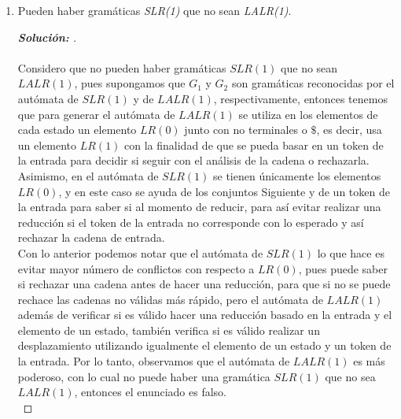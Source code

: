 \documentclass{article}
\begin{document}
\begin{enumerate}
\begin{enumerate}
        \item Pueden haber gramáticas \textit{SLR(1)} que no sean \textit{LALR(1)}.
        \begin{proof}[\textbf{Solución: }]
            \quad \\ \\
            Considero que no pueden haber gramáticas $SLR(1)$ que no sean $LALR(1)$, pues supongamos que $G_1$ y $G_2$ son gramáticas reconocidas por el autómata de $SLR(1)$ y de $LALR(1)$, respectivamente, entonces tenemos que para generar el autómata de $LALR(1)$ se utiliza en los elementos de cada estado un elemento $LR(0)$ junto con no terminales o $\$$, es decir, usa un elemento $LR(1)$ con la finalidad de que se pueda basar en un token de la entrada para decidir si seguir con el análisis de la cadena o rechazarla. Asimismo, en el autómata de $SLR(1)$ se tienen únicamente los elementos $LR(0)$, y en este caso se ayuda de los conjuntos Siguiente y de un token de la entrada para saber si al momento de reducir, para así evitar realizar una reducción si el token de la entrada no corresponde con lo esperado y así rechazar la cadena de entrada. \\

            Con lo anterior podemos notar que el autómata de $SLR(1)$ lo que hace es evitar mayor número de conflictos con respecto a $LR(0)$, pues puede saber si rechazar una cadena antes de hacer una reducción, para que si no se puede rechace las cadenas no válidas más rápido, pero el autómata de $LALR(1)$ además de verificar si es válido hacer una reducción basado en la entrada y el elemento de un estado, también verifica si es válido realizar un desplazamiento utilizando igualmente el elemento de un estado y un token de la entrada. Por lo tanto, observamos que el autómata de $LALR(1)$ es más poderoso, con lo cual no puede haber una gramática $SLR(1)$ que no sea $LALR(1)$, entonces el enunciado es falso. \\
        \end{proof}
    \end{enumerate}
    

\end{enumerate}
\end{document}
